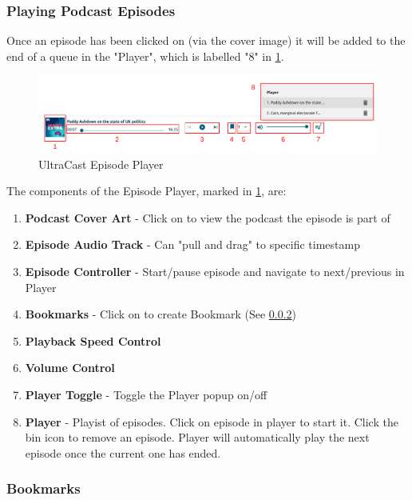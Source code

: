\documentclass[../report.tex]{subfiles}
\begin{document}
\subsubsection{Playing Podcast Episodes} \label{sssec:UM_playing_episodes}

Once an episode has been clicked on (via the cover image) it will be added to
the end of a queue in the "Player", which is labelled "8" in \cref{fig:UM_episode_player}.
%
\begin{figure}[ht]
    \centering
    \includegraphics[width=16cm]{resources/UM_Episode_Player}
    \caption{UltraCast Episode Player}
    \label{fig:UM_episode_player} 
\end{figure}
% 
The components of the Episode Player, marked in \cref{fig:UM_episode_player}, are:
\begin{enumerate}
    \item \textbf{Podcast Cover Art} - Click on to view the podcast the episode is part of
    \item \textbf{Episode Audio Track} - Can "pull and drag" to specific timestamp
    \item \textbf{Episode Controller} - Start/pause episode and navigate to next/previous in Player
    \item \textbf{Bookmarks} - Click on to create Bookmark (See \cref{sssec:UM_bookmarks})
    \item \textbf{Playback Speed Control}
    \item \textbf{Volume Control}
    \item \textbf{Player Toggle} - Toggle the Player popup on/off
    \item \textbf{Player} - Playist of episodes. Click on episode in player to start it. Click the bin icon to remove an episode. Player will automatically play the next episode once the current one has ended.
\end{enumerate}

\subsubsection{Bookmarks} \label{sssec:UM_bookmarks}
\end{document}
